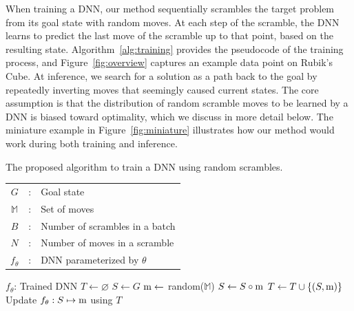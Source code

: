 \documentclass[nohyperref]{article}
\theoremstyle{plain}
\theoremstyle{definition}
\theoremstyle{remark}
\begin{document}
When training a DNN, our method sequentially scrambles the target problem from its goal state with random moves.
At each step of the scramble, the DNN learns to predict the last move of the scramble up to that point, based on the resulting state.
Algorithm~\ref{alg:training} provides the pseudocode of the training process, and Figure~\ref{fig:overview} captures an example data point on Rubik's Cube.
At inference, we search for a solution as a path back to the goal by repeatedly inverting moves that seemingly caused current states.
The core assumption is that the distribution of random scramble moves to be learned by a DNN is biased toward optimality, which we discuss in more detail below.
The miniature example in Figure~\ref{fig:miniature} illustrates how our method would work during both training and inference.

\begin{algorithm}[tb]
    \caption{The proposed algorithm to train a DNN using random scrambles.}
    \label{alg:training}
    \begin{algorithmic}
        \STATE
        \begin{tabular}{c@{}c@{\hskip 0.5em}l}
            \hspace{2.0em}$G$          & : & Goal state                     \\
            \hspace{2.0em}$\mathbb{M}$ & : & Set of moves                   \\
            \hspace{2.0em}$B$          & : & Number of scrambles in a batch \\
            \hspace{2.0em}$N$          & : & Number of moves in a scramble  \\
            \hspace{2.0em}$f_{\theta}$ & : & DNN parameterized by $\theta$  \\
        \end{tabular}
        \hspace{2.0em}$f_{\theta}$: Trained DNN
        \STATE $T \gets \varnothing$
        \STATE $S \gets G$
        \STATE $\textnormal{m} \gets$ random($\mathbb{M}$)
        \STATE $S \gets S \circ \textnormal{m}$
        \STATE $T \gets T \cup \{(S, \textnormal{m})\}$
        \ENDFOR
        \ENDFOR
        \STATE Update $f_{\theta}: S\mapsto \textnormal{m}$ using $T$
        \ENDWHILE
    \end{algorithmic}
\end{algorithm}
\end{document}
